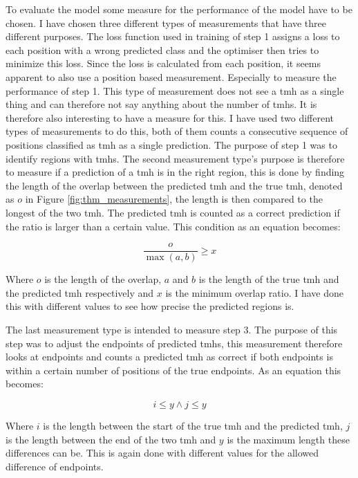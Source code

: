 To evaluate the model some measure for the performance of the model have to be chosen.
I have chosen three different types of measurements that have three different purposes.
The loss function used in training of step 1 assigns a loss to each position with a 
wrong predicted class and the optimiser then tries to minimize this loss. 
Since the loss is calculated from each position, it seems apparent to also use a 
position based measurement. Especially to measure the performance of step 1.
This type of measurement does not see a \gls{tmh} as a single thing and can therefore
not say anything about the number of \glspl{tmh}. It is therefore also interesting 
to have a measure for this. I have used two different types of measurements to do this, 
both of them counts a consecutive sequence of positions classified as \gls{tmh} as a single
prediction. The purpose of step 1 was to identify regions with \glspl{tmh}.
The second measurement type's purpose is therefore to measure if a prediction of a 
\gls{tmh} is in the right region, this is done by finding the length of the overlap 
between the predicted \gls{tmh} and the true \gls{tmh}, denoted as $o$ in Figure 
\ref{fig:thm_measurements}, the length is then compared 
to the longest of the two \gls{tmh}. The predicted \gls{tmh} is counted as a correct prediction
if the ratio is larger than a certain value. This condition as an equation becomes:

\begin{equation}
	\frac{o}{\max(a, b)} \geq x
\end{equation}

Where $o$ is the length of the overlap, $a$ and $b$ is the length of the true \gls{tmh}
and the predicted \gls{tmh} respectively and $x$ is the minimum overlap ratio.
I have done this with different values to see how precise the predicted regions is. 

The last measurement type is intended to measure step 3. The purpose of
this step was to adjust the endpoints of predicted \glspl{tmh}, this measurement 
therefore looks at endpoints and counts a predicted \gls{tmh} as correct if both endpoints 
is within a certain number of positions of the true endpoints. 
As an equation this becomes:

\begin{equation}
	i \leq y \wedge j \leq y
\end{equation}

Where $i$ is the length between the start of the true \gls{tmh} and the predicted \gls{tmh},
$j$ is the length between the end of the two \gls{tmh} and $y$ is the maximum length these
differences can be. This is again done with 
different values for the allowed difference of endpoints. 

